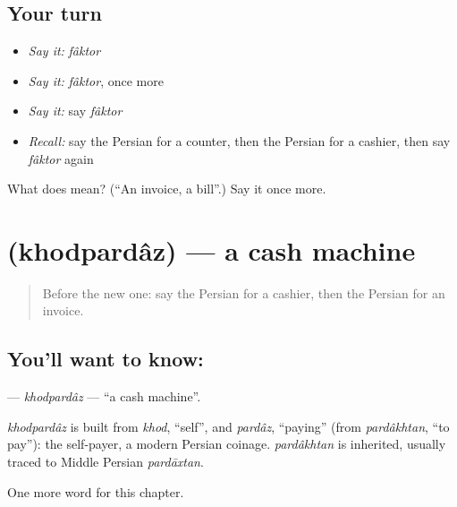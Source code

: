 \subsection*{Your turn}
\begin{itemize}
\raggedright
  \item \emph{Say it:} \emph{fâktor}
  \item \emph{Say it:} \emph{fâktor}, once more
  \item \emph{Say it:} say \emph{fâktor}
  \item \emph{Recall:} say the Persian for a counter, then the Persian for a cashier, then say \emph{fâktor} again
\end{itemize}

\begin{tcolorbox}[breakable,colback=teal!4,colframe=teal!35!black,title={Before you move on}]
What does  mean? (\textquotedblleft{}An invoice, a bill\textquotedblright{}.) Say it once more.
\end{tcolorbox}
\section[\texorpdfstring{\fa{خودپرداز} (khodpardâz)}{خودپرداز (khodpardâz)}]{ (khodpardâz) — a cash machine}

\label{lesson:FA-C286-khodpardaz}



\begin{quote}
Before the new one: say the Persian for a cashier, then the Persian for an invoice.
\end{quote}

\subsection*{You'll want to know: }
\textbf{} — \emph{khodpardâz} — \textquotedblleft{}a cash machine\textquotedblright{}.

\begin{cousinweb}
\emph{khodpardâz} is built from \emph{khod}, \textquotedblleft{}self\textquotedblright{}, and \emph{pardâz}, \textquotedblleft{}paying\textquotedblright{} (from \emph{pardâkhtan}, \textquotedblleft{}to pay\textquotedblright{}): the self-payer, a modern Persian coinage. \emph{pardâkhtan} is inherited, usually traced to Middle Persian \emph{pardāxtan}.
\end{cousinweb}

\begin{grammarlens}[title={What you've built}]
One more word for this chapter.
\end{grammarlens}

